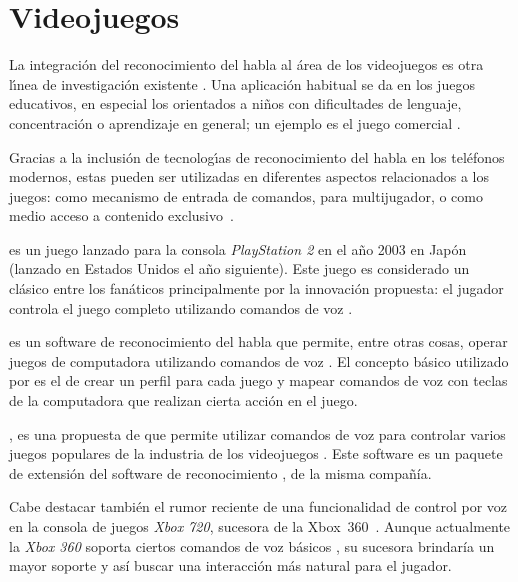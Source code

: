 \section{Videojuegos}
\label{sec:videojuegos}

La integraci\'on del reconocimiento del habla al \'area de los videojuegos es otra l{\'\i}nea de
investigaci\'on existente \cite{SporkaNonSpeech2006, JanickiAutomatic2011}. 
Una aplicaci\'on habitual se da en los juegos educativos, en especial los orientados a ni\~nos 
con dificultades de lenguaje, concentraci\'on o aprendizaje en general; un ejemplo es el juego
comercial  \cite{SayNPlay}.

Gracias a la inclusi\'on de tecnolog{\'\i}as de reconocimiento del habla en los tel\'efonos modernos,
estas pueden ser utilizadas en diferentes aspectos relacionados a los juegos: como mecanismo de entrada 
de comandos, para  multijugador, o como medio acceso a contenido 
\mbox{exclusivo \cite{JoselliMobile2009}}.

 es un juego lanzado para la consola \emph{PlayStation 2} en el a\~no 2003 en Jap\'on (lanzado en Estados Unidos
el a\~no siguiente). Este
juego es considerado un cl\'asico entre los fan\'aticos principalmente por la innovaci\'on propuesta: el jugador controla 
el juego completo utilizando comandos de voz \cite{Lifeline}.

 es un software de reconocimiento del habla que permite, entre otras cosas, operar juegos de computadora
utilizando comandos de voz \cite{tazti}. El concepto b\'asico utilizado por  es el de crear un perfil para
cada juego y mapear comandos de voz con teclas de la computadora que realizan cierta acci\'on en el juego.

, es una propuesta de  que permite utilizar comandos de
voz para controlar varios juegos populares de la industria de los videojuegos \cite{DragonGamingSpeech}. Este software
es un paquete de extensi\'on del software de reconocimiento , de la misma compa\~n\'ia.

Cabe destacar tambi\'en el rumor reciente de una funcionalidad de control por voz en
la consola de juegos \emph{Xbox 720}, sucesora de la \mbox{Xbox 360 \cite{IgnXbox}}. Aunque actualmente la \emph{Xbox 360}
soporta ciertos comandos de voz b\'asicos \cite{KinectVoice}, su sucesora brindar\'ia un mayor soporte y as\'i buscar
una interacci\'on m\'as natural para el jugador.
